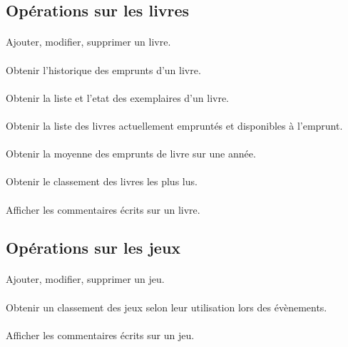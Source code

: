 \documentclass[a4paper, 11pt]{article}
\begin{document}
\subsection{Opérations sur les livres}
\paragraph{}
Ajouter, modifier, supprimer un livre.
\paragraph{}
Obtenir l'historique des emprunts d'un livre.
\paragraph{}
Obtenir la liste et l'etat des exemplaires d'un livre.
\paragraph{}
Obtenir la liste des livres actuellement empruntés et disponibles à l'emprunt.
\paragraph{}
Obtenir la moyenne des emprunts de livre sur une année.
\paragraph{}
Obtenir le classement des livres les plus lus.
\paragraph{}
Afficher les commentaires écrits sur un livre.
\subsection{Opérations sur les jeux}
\paragraph{}
Ajouter, modifier, supprimer un jeu.
\paragraph{}
Obtenir un classement des jeux selon leur utilisation lors des évènements.
\paragraph{}
Afficher les commentaires écrits sur un jeu.
\end{document}
